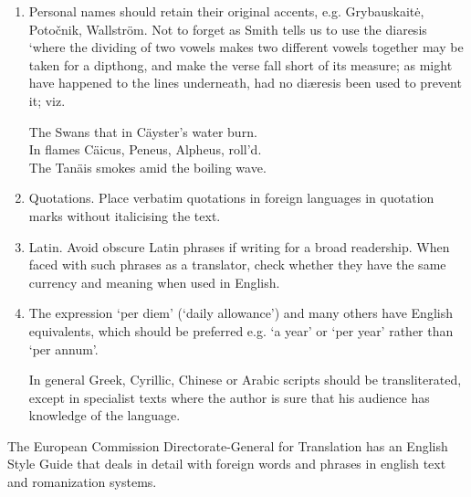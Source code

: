 \begin{enumerate}
\item Personal names should retain their original accents, e.g. Grybauskait\.{e},
Potočnik, Wallstr\"{o}m. Not to forget as Smith tells us to use the diaresis `where the dividing of two vowels makes two different vowels together may be taken for a dipthong, and make the verse fall short of its measure; as might have happened to the lines underneath, had no di\ae resis been used to prevent it; viz.

{\hskip3cm \narrower\narrower\it

 The Swans that in C\"ayster's water burn.\\
 In flames C\"aicus, Peneus, Alpheus, roll'd.\\
 The Tan\"ais smokes amid the boiling wave.\\

}

\item Quotations. Place verbatim quotations in foreign languages in quotation marks
without italicising the text.

\item Latin. Avoid obscure Latin phrases if writing for a broad readership. When
faced with such phrases as a translator, check whether they have the same
currency and meaning when used in English.

\item The expression `per diem' (`daily allowance') and many others have English
equivalents, which should be preferred e.g. `a year' or `per year' rather than `per annum'.

In general Greek, Cyrillic, Chinese or Arabic scripts should be transliterated, except in specialist texts where the author is sure that his audience has knowledge of the language.

\end{enumerate}

The European Commission Directorate-General for Translation has an English Style Guide that deals in detail with foreign words and phrases in english text and romanization systems.



















